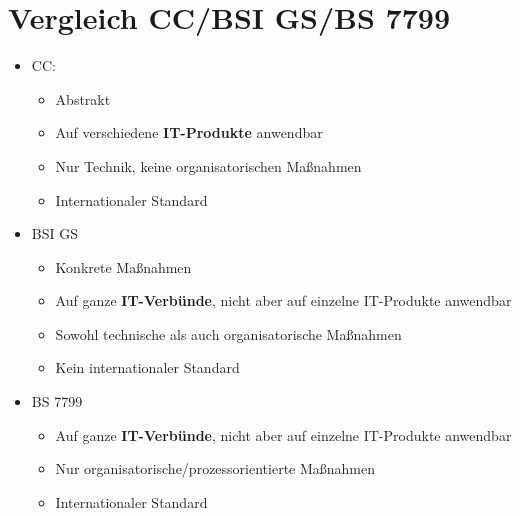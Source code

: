 \documentclass[openany]{book}
\begin{document}
\section{Vergleich CC/BSI GS/BS 7799}

\begin{itemize}
    \item CC:
    \begin{itemize}
        \item Abstrakt
        \item Auf verschiedene \textbf{IT-Produkte} anwendbar
        \item Nur Technik, keine organisatorischen Maßnahmen
        \item Internationaler Standard
    \end{itemize}
    \item BSI GS
    \begin{itemize}
        \item Konkrete Maßnahmen
        \item Auf ganze \textbf{IT-Verbünde}, nicht aber auf einzelne IT-Produkte anwendbar
        \item Sowohl technische als auch organisatorische Maßnahmen
        \item Kein internationaler Standard
    \end{itemize}
    \item BS 7799
    \begin{itemize}
        \item Auf ganze \textbf{IT-Verbünde}, nicht aber auf einzelne IT-Produkte anwendbar
        \item Nur organisatorische/prozessorientierte Maßnahmen
        \item Internationaler Standard
    \end{itemize}
\end{itemize}
\end{document}
